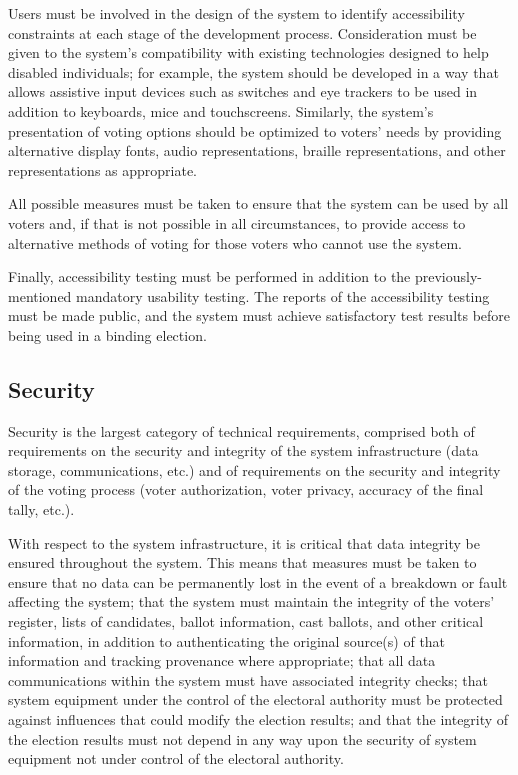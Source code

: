 Users must be involved in the design of the system to identify
accessibility constraints at each stage of the development
process. Consideration must be given to the system's compatibility
with existing technologies designed to help disabled individuals; for
example, the system should be developed in a way that allows assistive
input devices such as switches and eye trackers to be used in addition
to keyboards, mice and touchscreens. Similarly, the system's
presentation of voting options should be optimized to voters' needs by
providing alternative display fonts, audio representations, braille
representations, and other representations as appropriate.

All possible measures must be taken to ensure that the system can be
used by all voters and, if that is not possible in all circumstances,
to provide access to alternative methods of voting for those voters
who cannot use the system.

Finally, accessibility testing must be performed in addition to the
previously-mentioned mandatory usability testing. The reports of the
accessibility testing must be made public, and the system must achieve
satisfactory test results before being used in a binding election.

\subsection{Security}

Security is the largest category of technical requirements, comprised
both of requirements on the security and integrity of the system
infrastructure (data storage, communications, etc.) and of
requirements on the security and integrity of the voting process
(voter authorization, voter privacy, accuracy of the final tally,
etc.).

With respect to the system infrastructure, it is critical that data
integrity be ensured throughout the system. This means that measures
must be taken to ensure that no data can be permanently lost in the
event of a breakdown or fault affecting the system; that the system
must maintain the integrity of the voters' register, lists of
candidates, ballot information, cast ballots, and other critical
information, in addition to authenticating the original source(s) of
that information and tracking provenance where appropriate; that all
data communications within the system must have associated integrity
checks; that system equipment under the control of the electoral
authority must be protected against influences that could modify the
election results; and that the integrity of the election results must
not depend in any way upon the security of system equipment not under
control of the electoral authority.


